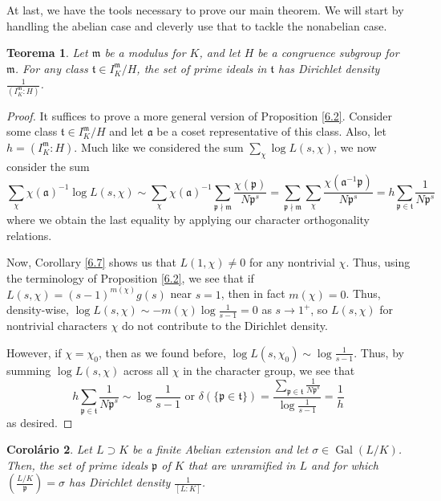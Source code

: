 \documentclass{article}
\DeclareMathOperator{\Gal}{Gal}
\theoremstyle{plain}
\newtheorem{thm}{Teorema}
\newtheorem{cor}[thm]{Corolário}
\theoremstyle{definition}
\theoremstyle{remark}
\numberwithin{equation}{section}
\numberwithin{thm}{section}
\begin{document}
At last, we have the tools necessary to prove our main theorem. We will start by handling the abelian case and cleverly use that to tackle the nonabelian case. 

\begin{thm} \label{7.1}
Let $\mathfrak{m}$ be a modulus for $K$, and let $H$ be a congruence subgroup for $\mathfrak{m}$. For any class $\mathfrak{t} \in I_{K}^{\mathfrak{m}}/H$, the set of prime ideals in $\mathfrak{t}$ has Dirichlet density $\frac{1}{(I_{K}^{\mathfrak{m}} : H)}$. 
\end{thm}

\begin{proof}
It suffices to prove a more general version of Proposition \ref{6.2}. Consider some class $\mathfrak{t} \in I_{K}^{\mathfrak{m}}/H$ and let $\mathfrak{a}$ be a coset representative of this class. Also, let $h = (I_{K}^{\mathfrak{m}} : H)$. Much like we considered the sum $\sum_{\chi} \log L(s,\chi)$, we now consider the sum $$\sum_{\chi} \chi(\mathfrak{a})^{-1}\log L(s, \chi) \sim \sum_{\chi} \chi(\mathfrak{a})^{-1} \sum_{\mathfrak{p} \nmid \mathfrak{m}} \frac{\chi(\mathfrak{p})}{N\mathfrak{p}^{s}} = \sum_{\mathfrak{p} \nmid \mathfrak{m}} \sum_{\chi} \frac{\chi(\mathfrak{a}^{-1}\mathfrak{p})}{N\mathfrak{p}^{s}} = h \sum_{\mathfrak{p} \in \mathfrak{t}} \frac{1}{N\mathfrak{p}^{s}}$$ where we obtain the last equality by applying our character orthogonality relations. 

Now, Corollary \ref{6.7} shows us that $L(1, \chi) \neq 0$ for any nontrivial $\chi$. Thus, using the terminology of Proposition \ref{6.2}, we see that if $L(s, \chi) = (s-1)^{m(\chi)}g(s)$ near $s = 1$, then in fact $m(\chi) = 0$. Thus, density-wise, $\log L(s, \chi) \sim -m(\chi)\log\frac{1}{s-1} = 0$ as $s \to 1^{+}$, so $L(s, \chi)$ for nontrivial characters $\chi$ do not contribute to the Dirichlet density. 

However, if $\chi = \chi_{0}$, then as we found before, $\log L(s, \chi_{0}) \sim \log\frac{1}{s-1}$. Thus, by summing $\log L(s, \chi)$ across all $\chi$ in the character group, we see that $$h \sum_{\mathfrak{p} \in \mathfrak{t}} \frac{1}{N\mathfrak{p}^{s}} \sim \log\frac{1}{s-1} \text{ or } \delta(\{\mathfrak{p} \in \mathfrak{t}\}) = \frac{\sum_{\mathfrak{p} \in \mathfrak{t}} \frac{1}{N\mathfrak{p}^{s}}}{\log\frac{1}{s-1}} = \frac{1}{h}$$ as desired.
\end{proof}

\begin{cor} \label{7.2}
Let $L \supset K$ be a finite Abelian extension and let $\sigma \in \Gal(L/K)$. Then, the set of prime ideals $\mathfrak{p}$ of $K$ that are unramified in $L$ and for which $\left(\frac{L/K}{\mathfrak{p}}\right) = \sigma$ has Dirichlet density $\frac{1}{[L : K]}$. 
\end{cor}
\end{document}
